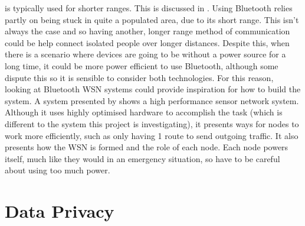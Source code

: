 \documentclass{report}
\begin{document}
is typically used for shorter ranges. This is discussed in \cite{bhagwat2001bluetooth}. Using Bluetooth relies partly on being stuck in quite a populated area, due to its short range. This isn't always the case and so having another, longer 
range method of communication could be help connect isolated people over longer distances. Despite this, when there is a scenario 
where devices are going to be without a power source for a long time, it could be more power efficient to use Bluetooth\cite{putra2017comparison}, although some 
dispute this \cite{friedman2012power} so it is sensible to consider both technologies. For this reason, looking at Bluetooth WSN systems could provide inspiration for 
how to build the system. A system presented by \cite{chu2010design} shows a high performance sensor network system. Although it uses highly optimised hardware 
to accomplish the task (which is different to the system this project is investigating), it presents ways for nodes to work more efficiently, such as only having 1 
route to send outgoing traffic. It also presents how the WSN is formed and the role of each node. Each node powers itself, much like they would in an emergency situation, 
so have to be careful about using too much power. 

\section*{Data Privacy}
\end{document}
